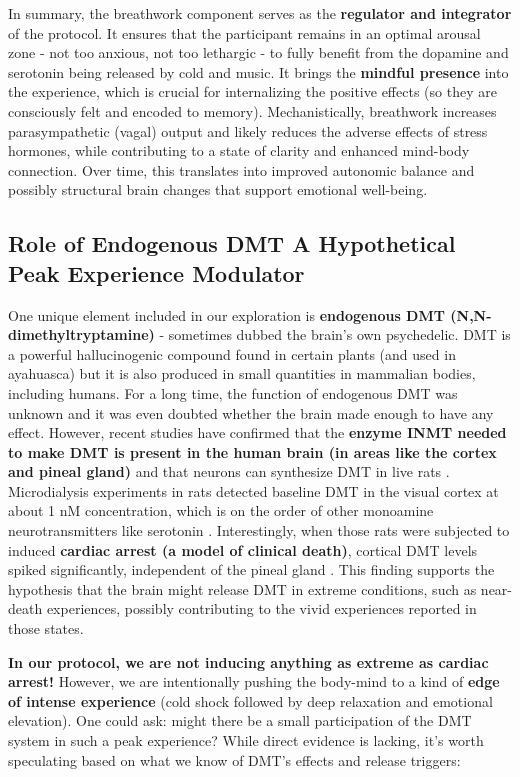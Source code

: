 \documentclass[11pt]{article}
\begin{document}
In summary, the breathwork component serves as the \textbf{regulator and integrator} of the protocol. It ensures that the participant remains in an optimal arousal zone - not too anxious, not too lethargic - to fully benefit from the dopamine and serotonin being released by cold and music. It brings the \textbf{mindful presence} into the experience, which is crucial for internalizing the positive effects (so they are consciously felt and encoded to memory). Mechanistically, breathwork increases parasympathetic (vagal) output and likely reduces the adverse effects of stress hormones, while contributing to a state of clarity and enhanced mind-body connection. Over time, this translates into improved autonomic balance and possibly structural brain changes that support emotional well-being.

\subsection{Role of Endogenous DMT\: A Hypothetical Peak Experience Modulator}

One unique element included in our exploration is \textbf{endogenous DMT (N,N-dimethyltryptamine)} - sometimes dubbed the brain's own psychedelic. DMT is a powerful hallucinogenic compound found in certain plants (and used in ayahuasca) but it is also produced in small quantities in mammalian bodies, including humans. For a long time, the function of endogenous DMT was unknown and it was even doubted whether the brain made enough to have any effect. However, recent studies have confirmed that the \textbf{enzyme INMT needed to make DMT is present in the human brain (in areas like the cortex and pineal gland)} and that neurons can synthesize DMT in live rats \cite{Dean2019}. Microdialysis experiments in rats detected baseline DMT in the visual cortex at about 1 nM concentration, which is on the order of other monoamine neurotransmitters like serotonin \cite{Dean2019}. Interestingly, when those rats were subjected to induced \textbf{cardiac arrest (a model of clinical death)}, cortical DMT levels spiked significantly, independent of the pineal gland \cite{Dean2019}. This finding supports the hypothesis that the brain might release DMT in extreme conditions, such as near-death experiences, possibly contributing to the vivid experiences reported in those states.

\textbf{In our protocol, we are not inducing anything as extreme as cardiac arrest!} However, we are intentionally pushing the body-mind to a kind of \textbf{edge of intense experience} (cold shock followed by deep relaxation and emotional elevation). One could ask: might there be a small participation of the DMT system in such a peak experience? While direct evidence is lacking, it's worth speculating based on what we know of DMT's effects and release triggers:
\end{document}
